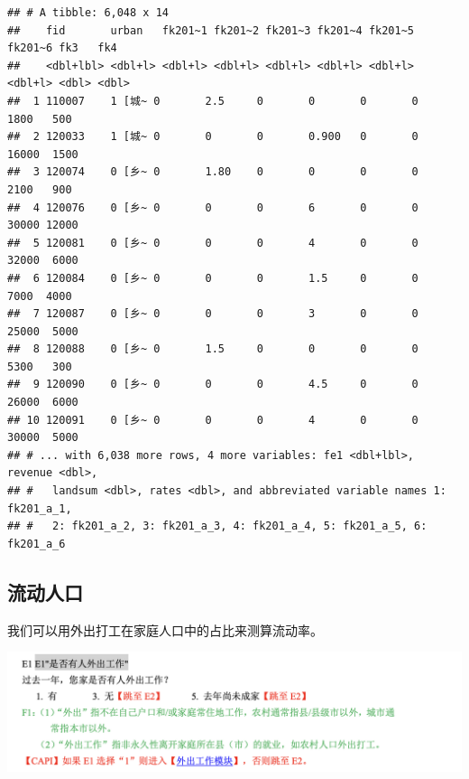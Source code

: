 \documentclass[
  oneside]{book}
\newenvironment{Shaded}{\begin{snugshade}}{\end{snugshade}}
\newcommand{\DecValTok}[1]{\textcolor[rgb]{0.00,0.00,0.81}{#1}}
\newcommand{\FunctionTok}[1]{\textcolor[rgb]{0.00,0.00,0.00}{#1}}
\newcommand{\NormalTok}[1]{#1}
\newcommand{\OtherTok}[1]{\textcolor[rgb]{0.56,0.35,0.01}{#1}}
\newcommand{\SpecialCharTok}[1]{\textcolor[rgb]{0.00,0.00,0.00}{#1}}
\newcommand{\StringTok}[1]{\textcolor[rgb]{0.31,0.60,0.02}{#1}}
\begin{document}
\begin{verbatim}
## # A tibble: 6,048 x 14
##    fid       urban   fk201~1 fk201~2 fk201~3 fk201~4 fk201~5 fk201~6 fk3   fk4  
##    <dbl+lbl> <dbl+l> <dbl+l> <dbl+l> <dbl+l> <dbl+l> <dbl+l> <dbl+l> <dbl> <dbl>
##  1 110007    1 [城~ 0       2.5     0       0       0       0        1800   500
##  2 120033    1 [城~ 0       0       0       0.900   0       0       16000  1500
##  3 120074    0 [乡~ 0       1.80    0       0       0       0        2100   900
##  4 120076    0 [乡~ 0       0       0       6       0       0       30000 12000
##  5 120081    0 [乡~ 0       0       0       4       0       0       32000  6000
##  6 120084    0 [乡~ 0       0       0       1.5     0       0        7000  4000
##  7 120087    0 [乡~ 0       0       0       3       0       0       25000  5000
##  8 120088    0 [乡~ 0       1.5     0       0       0       0        5300   300
##  9 120090    0 [乡~ 0       0       0       4.5     0       0       26000  6000
## 10 120091    0 [乡~ 0       0       0       4       0       0       30000  5000
## # ... with 6,038 more rows, 4 more variables: fe1 <dbl+lbl>, revenue <dbl>,
## #   landsum <dbl>, rates <dbl>, and abbreviated variable names 1: fk201_a_1,
## #   2: fk201_a_2, 3: fk201_a_3, 4: fk201_a_4, 5: fk201_a_5, 6: fk201_a_6
\end{verbatim}

\hypertarget{ux6d41ux52a8ux4ebaux53e3}{%
\subsection{流动人口}\label{ux6d41ux52a8ux4ebaux53e3}}

我们可以用外出打工在家庭人口中的占比来测算流动率。

\includegraphics{image/fe1.png}

\begin{Shaded}
\end{Shaded}
\end{document}
